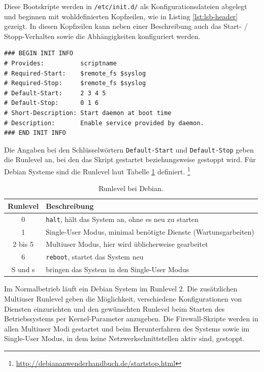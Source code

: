 Diese Bootskripte werden in {\tt /etc/init.d/} als Konfigurationsdateien
abgelegt und beginnen mit wohldefinierten Kopfzeilen, wie in Listing
\ref{lst:lsb-header} gezeigt.
In diesen Kopfzeilen kann neben einer Beschreibung auch das
Start- / Stopp-Verhalten sowie die Abhängigkeiten konfiguriert werden.

\begin{lstlisting}[label=lst:lsb-header,caption={Init Script LSB: Kopfzeilen.}]
### BEGIN INIT INFO
# Provides:          scriptname
# Required-Start:    $remote_fs $syslog
# Required-Stop:     $remote_fs $syslog
# Default-Start:     2 3 4 5
# Default-Stop:      0 1 6
# Short-Description: Start daemon at boot time
# Description:       Enable service provided by daemon.
### END INIT INFO
\end{lstlisting}

Die Angaben bei den Schlüsselwörtern {\tt Default-Start} und {\tt Default-Stop}
geben die Runlevel an, bei den das Skript gestartet beziehungsweise gestoppt
wird.
Für Debian Systeme sind die Runlevel laut Tabelle \ref{tab.runlevel} definiert.
\footnote{
\url{http://debiananwenderhandbuch.de/startstop.html}
}

\begin{table}[htb]
    \centering
    \begin{tabular}{|c|l|}
        \hline
        Runlevel & Beschreibung\\
        \hline
        0       & {\tt halt}, hält das System an, ohne es neu zu starten\\
        1       & Single-User Modus, minimal benötigte Dienste (Wartunsgarbeiten)\\
        2 bis 5 & Multiuser Modus, hier wird üblicherweise gearbeitet\\
        6       & {\tt reboot}, startet das System neu\\
        S und s & bringen das System in den Single-User Modus\\
        \hline
    \end{tabular}
   \caption{Runlevel bei Debian.}\label{tab.runlevel}
\end{table}

\noindent Im Normalbetrieb läuft ein Debian System im Runlevel 2.
Die zusätzlichen Multiuser Runlevel geben die Möglichkeit, verschiedene
Konfigurationen von Diensten einzurichten und den gewünschten Runlevel beim
Starten des Betriebssystems per Kernel-Parameter anzugeben.
Die Firewall-Skripte werden in allen Multiuser Modi gestartet und beim
Herunterfahren des Systems sowie im Single-User Modus, in dem keine
Netzwerkschnittstellen aktiv sind, gestoppt.

